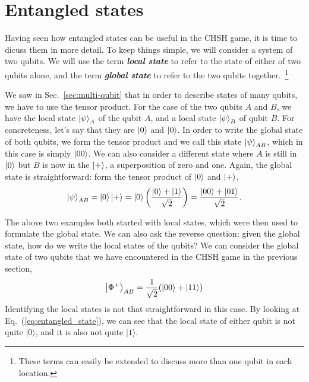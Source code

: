 \section{Entangled states}
\label{sec:4_2-entagnled_states}

Having seen how entangled states can be useful in the CHSH game, it is time to dicuss them in more detail.
To keep things simple, we will consider a system of two qubits.
We will use the term \textbf{\emph{local state}} to refer to the state of either of two qubits alone, and the term \textbf{\emph{global state}} to refer to the two qubits together.~\footnote{These terms can easily be extended to discuss more than one qubit in each location.}

We saw in Sec.~\ref{sec:multi-qubit} that in order to describe states of many qubits, we have to use the tensor product. For the case of the two qubits $A$ and $B$, we have the local state $\left| \psi \right\rangle_A$ of the qubit $A$, and a local state $\left| \psi \right\rangle_B$ of qubit $B$.
For concreteness, let's say that they are $\left| 0 \right\rangle$ and $\left| 0 \right\rangle$.
In order to write the global state of both qubits, we form the tensor product and we call this state $\left| \psi \right\rangle_{AB}$, which in this case is simply $\left| 00 \right\rangle$.
We can also consider a different state where $A$ is still in $\left| 0 \right\rangle$ but $B$ is now in the $\left| + \right\rangle$, a superposition of zero and one.
Again, the global state is straightforward: form the tensor product of $\left| 0 \right\rangle$ and $\left| + \right\rangle$,
\begin{equation}
\left| \psi \right\rangle_{AB} = \left| 0 \right\rangle\left| + \right\rangle = \left| 0 \right\rangle\left(\frac{\left| 0 \right\rangle + \left| 1 \right\rangle}{\sqrt{2}}\right) = \frac{\left| 00 \right\rangle + \left| 01 \right\rangle}{\sqrt2}.
\end{equation}

The above two examples both started with local states, which were then used to formulate the global state.
We can also ask the reverse question: given the global state, how do we write the local states of the qubits?
We can consider the global state of two qubits that we have encountered in the CHSH game in the previous section,
\begin{equation}
    \left| \Phi^+ \right\rangle_{AB} = \frac{1}{\sqrt2}(\left| 00 \right\rangle + \left| 11 \right\rangle)
    \label{eq:entangled_state}
\end{equation}
Identifying the local states is not that straightforward in this case.
By looking at Eq.~(\ref{eq:entangled_state}), we can see that the local state of either qubit is not quite $|0\rangle$, and it is also not quite $|1\rangle$.

